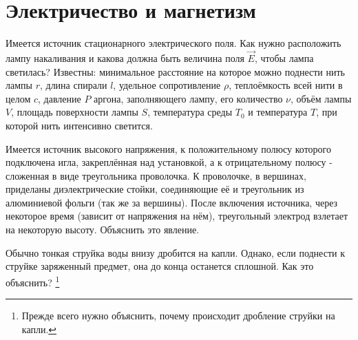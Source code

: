 \chapter{Электричество и магнетизм}
\thispagestyle{empty}
\clearpage
\begin{problem}
Имеется источник стационарного электрического поля. Как нужно расположить лампу накаливания и какова должна быть величина поля $\vec{E}$, чтобы лампа светилась? Известны: минимальное расстояние на которое можно поднести нить лампы $r$, длина спирали $l$, удельное сопротивление $\rho$, теплоёмкость всей нити в целом $c$, давление $P$ аргона, заполняющего лампу, его количество $\nu$, объём лампы $V$, площадь поверхности лампы $S$, температура среды $T_0$ и температура $T$, при которой нить интенсивно светится.
\end{problem}
\begin{problem}
Имеется источник высокого напряжения, к положительному полюсу которого подключена игла, закреплённая над установкой, а к отрицательному полюсу - сложенная в виде треугольника проволочка. К проволочке, в вершинах, приделаны диэлектрические стойки, соединяющие её и треугольник из алюминиевой фольги (так же за вершины). После включения источника, через некоторое время (зависит от напряжения на нём), треугольный электрод взлетает на некоторую высоту. Объяснить это явление.
\end{problem}
\begin{problem}
Обычно тонкая струйка воды внизу дробится на капли. Однако, если поднести к струйке заряженный предмет, она до конца останется сплошной. Как это объяснить?
\footnote{Прежде всего нужно объяснить, почему происходит дробление струйки на капли.}
\end{problem}